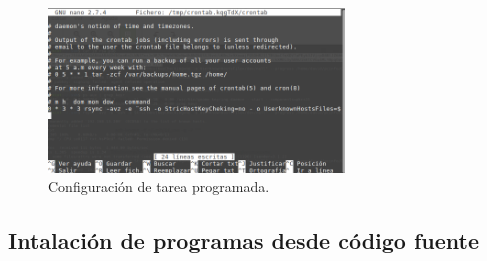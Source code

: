 \documentclass[11pt]{article}
\begin{document}
\begin{figure}[H]
  \centering
    \includegraphics[width=0.7\textwidth]{img/33}
  \caption{Configuración de tarea programada.}
\end{figure}



\subsection{Intalación de programas desde código fuente}
\end{document}
